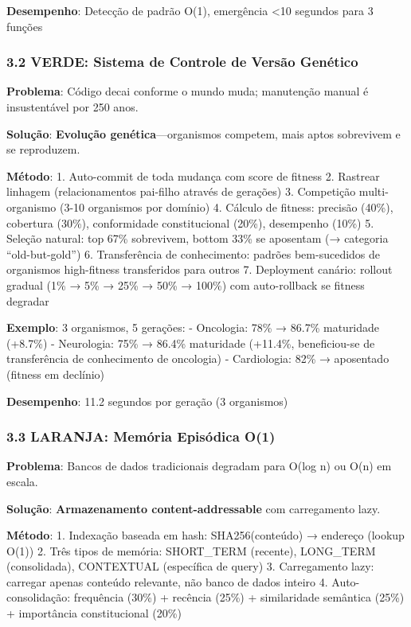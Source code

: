 \documentclass[
]{article}
\begin{document}
\textbf{Desempenho}: Detecção de padrão O(1), emergência \textless10
segundos para 3 funções

\subsubsection{3.2 VERDE: Sistema de Controle de Versão
Genético}\label{verde-sistema-de-controle-de-versuxe3o-genuxe9tico}

\textbf{Problema}: Código decai conforme o mundo muda; manutenção manual
é insustentável por 250 anos.

\textbf{Solução}: \textbf{Evolução genética}---organismos competem, mais
aptos sobrevivem e se reproduzem.

\textbf{Método}: 1. Auto-commit de toda mudança com score de fitness 2.
Rastrear linhagem (relacionamentos pai-filho através de gerações) 3.
Competição multi-organismo (3-10 organismos por domínio) 4. Cálculo de
fitness: precisão (40\%), cobertura (30\%), conformidade constitucional
(20\%), desempenho (10\%) 5. Seleção natural: top 67\% sobrevivem,
bottom 33\% se aposentam (→ categoria ``old-but-gold'') 6. Transferência
de conhecimento: padrões bem-sucedidos de organismos high-fitness
transferidos para outros 7. Deployment canário: rollout gradual (1\% →
5\% → 25\% → 50\% → 100\%) com auto-rollback se fitness degradar

\textbf{Exemplo}: 3 organismos, 5 gerações: - Oncologia: 78\% → 86.7\%
maturidade (+8.7\%) - Neurologia: 75\% → 86.4\% maturidade (+11.4\%,
beneficiou-se de transferência de conhecimento de oncologia) -
Cardiologia: 82\% → aposentado (fitness em declínio)

\textbf{Desempenho}: 11.2 segundos por geração (3 organismos)

\subsubsection{3.3 LARANJA: Memória Episódica
O(1)}\label{laranja-memuxf3ria-episuxf3dica-o1}

\textbf{Problema}: Bancos de dados tradicionais degradam para O(log n)
ou O(n) em escala.

\textbf{Solução}: \textbf{Armazenamento content-addressable} com
carregamento lazy.

\textbf{Método}: 1. Indexação baseada em hash: SHA256(conteúdo) →
endereço (lookup O(1)) 2. Três tipos de memória: SHORT\_TERM (recente),
LONG\_TERM (consolidada), CONTEXTUAL (específica de query) 3.
Carregamento lazy: carregar apenas conteúdo relevante, não banco de
dados inteiro 4. Auto-consolidação: frequência (30\%) + recência (25\%)
+ similaridade semântica (25\%) + importância constitucional (20\%)
\end{document}
